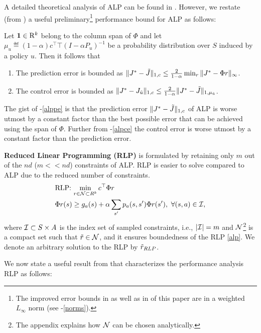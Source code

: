 A detailed theoretical analysis of ALP can be found in \cite{ALP}. However, we restate (from \cite{ALP}) a useful preliminary\footnote{The improved error bounds in \cite{ALP} as well as in  of this paper are in a weighted $L_\infty$ norm (see -\eqref{norms}).} performance bound for ALP as follows:
\begin{theorem}\label{alpvanilla}
Let $\mathbf{1}\in \mathrm{R}^k$ belong to the column span of $\Phi$ and let $\mu_u\eqdef (1-\alpha)c^\top\top(I-\alpha P_u)^{-1}$ be a probability distribution over $S$ induced by a policy $u$. Then it follows that
\begin{enumerate}
\item\label{alppe} The prediction error is bounded as $\|J^*-\tilde{J}\|_{1,c}\leq \frac{2}{1-\alpha}\min_{r}\|J^*-\Phi r\|_\infty$.
\item\label{alpce} The control error is bounded as $\|J^*-J_{\tilde{u}}\|_{1,c}\leq \frac{2}{1-\alpha}\|J^*-\tilde{J}\|_{1,\mu_{\tilde{u}}}$.
\end{enumerate}
\end{theorem}
The gist of -\eqref{alppe} is that the prediction error $\|J^*-\tilde{J}\|_{1,c}$ of ALP is worse utmost by a constant factor than the best possible error that can be achieved using the span of $\Phi$. Further from -\eqref{alpce} the control error is worse utmost by a constant factor than the prediction error.\par
\textbf{Reduced Linear Programming (RLP)} is formulated by retaining only $m$ out of the $nd$ ($m<<nd$) constraints of ALP. RLP is easier to solve compared to ALP due to the reduced number of constraints.
\begin{align}\label{rlp}
\begin{split}
&\text{RLP:~}\underset{r\in \N\subset R^k}{\min}\, c^\top \Phi r\,\,\\
&\Phi r (s)\geq g_a(s)+\alpha\sum_{s'}p_a(s,s')\Phi r(s'),\,\,
\forall (s,a)\in \I,
\end{split}
\end{align}
where $\mathcal{I}\subset S \times A$ is the index set of sampled constraints, i.e., $|\mathcal{I}|=m$ and $\mathcal{N}$\footnote{The appendix explains how $\mathcal{N}$ can be chosen analytically.} is a compact set such that $\tilde{r} \in \mathcal{N}$, and it ensures boundedness of the RLP \eqref{alp}. We denote an arbitrary solution to the RLP by $\tilde{r}_{RLP}$.\par
We now state a useful result from \cite{CS} that characterizes the performance analysis RLP as follows:

